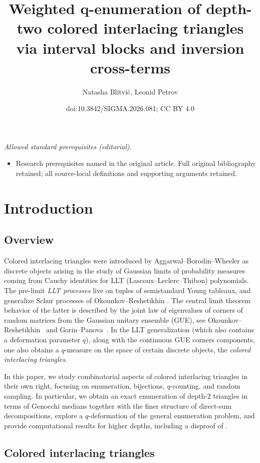 \documentclass[10pt,a4paper]{amsart}
\title{Weighted q-enumeration of depth-two colored interlacing triangles via interval blocks and inversion cross-terms}
\author{Natasha Blitvić, Leonid Petrov}
\date{doi:10.3842/SIGMA.2026.081; CC BY 4.0}
\numberwithin{equation}{section}
\theoremstyle{definition}
\begin{document}
\maketitle
\noindent\textit{Allowed standard prerequisites (editorial).}\begin{itemize}
\item Research prerequisites named in the original article. Full original bibliography retained; all source-local definitions and supporting arguments retained.
\end{itemize}\medskip
\section{Introduction}
\label{sec:intro}

\subsection{Overview}

Colored interlacing triangles were introduced by Aggarwal--Borodin--Wheeler
\cite{ABW2023coloured_LLT} as discrete objects arising in the study of Gaussian
limits of probability measures coming from Cauchy identities for LLT
(Lascoux--Leclerc--Thibon) polynomials.
The pre-limit \emph{LLT processes} live on tuples of semistandard Young
tableaux, and generalize Schur processes of Okounkov--Reshetikhin
\cite{okounkov2003correlation}.
The central limit theorem behavior of the latter is described by the joint law
of eigenvalues of corners of random matrices from the Gaussian unitary ensemble
(GUE), see Okounkov--Reshetikhin~\cite{OkounkovReshetikhin2006RandomMatr} and
Gorin--Panova~\cite{GorinPanova2012_full}.
In the LLT generalization (which also contains a deformation parameter $q$),
along with the continuous GUE corners components, one also obtains a $q$-measure
on the space of certain discrete objects, the \emph{colored interlacing
triangles}.

In this paper, we study combinatorial aspects of colored interlacing triangles
in their own right, focusing on enumeration, bijections, $q$-counting, and
random sampling.
In particular, we obtain an exact enumeration of depth-$2$ triangles in terms of
Genocchi medians together with the finer structure of direct-sum
decompositions, explore a $q$-deformation of the general enumeration problem,
and provide computational results for higher depths, including a disproof of
\cite[Conjecture~A.5]{ABW2023coloured_LLT}.

\subsection{Colored interlacing triangles}
\end{document}
